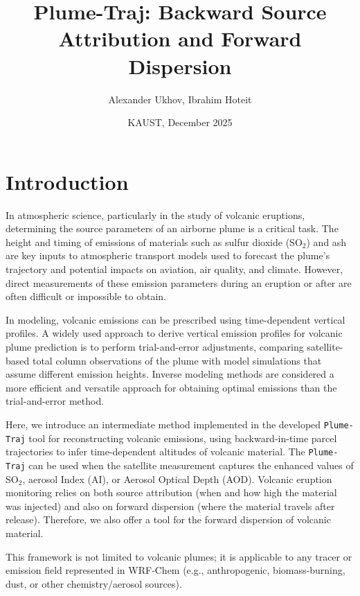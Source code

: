 \documentclass[11pt]{article}
\title{Plume-Traj: Backward Source Attribution and Forward Dispersion}
\author{Alexander Ukhov, Ibrahim Hoteit}
\date{KAUST, December 2025}
\begin{document}
\maketitle

\section*{Introduction}

In atmospheric science, particularly in the study of volcanic eruptions, determining the source parameters of an airborne plume is a critical task. The height and timing of emissions of materials such as sulfur dioxide (SO$_2$) and ash are key inputs to atmospheric transport models used to forecast the plume's trajectory and potential impacts on aviation, air quality, and climate. However, direct measurements of these emission parameters during an eruption or after are often difficult or impossible to obtain. %

In modeling, volcanic emissions can be prescribed using time-dependent vertical profiles. A widely used approach to derive vertical emission profiles for volcanic plume prediction is to perform trial-and-error adjustments, comparing satellite-based total column observations of the plume with model simulations that assume different emission heights. Inverse modeling methods are considered a more efficient and versatile approach for obtaining optimal emissions than the trial-and-error method. 

Here, we introduce an intermediate method implemented in the developed \texttt{Plume-Traj} tool for reconstructing volcanic emissions, using backward-in-time parcel trajectories to infer time-dependent altitudes of volcanic material. The \texttt{Plume-Traj} can be used when the satellite measurement captures the enhanced values of SO$_2$, aerosol Index (AI), or Aerosol Optical Depth (AOD). Volcanic eruption monitoring relies on both source attribution (when and how high the material was injected) and also on forward dispersion (where the material travels after release). Therefore, we also offer a tool for the forward dispersion of volcanic material.

This framework is not limited to volcanic plumes; it is applicable to any tracer or emission field represented in WRF‑Chem (e.g., anthropogenic, biomass‑burning, dust, or other chemistry/aerosol sources).
\end{document}
